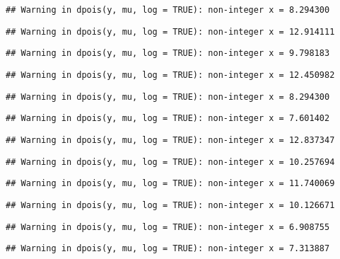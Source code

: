\documentclass[
]{article}
\begin{document}
\begin{verbatim}
## Warning in dpois(y, mu, log = TRUE): non-integer x = 8.294300
\end{verbatim}

\begin{verbatim}
## Warning in dpois(y, mu, log = TRUE): non-integer x = 12.914111
\end{verbatim}

\begin{verbatim}
## Warning in dpois(y, mu, log = TRUE): non-integer x = 9.798183
\end{verbatim}

\begin{verbatim}
## Warning in dpois(y, mu, log = TRUE): non-integer x = 12.450982
\end{verbatim}

\begin{verbatim}
## Warning in dpois(y, mu, log = TRUE): non-integer x = 8.294300
\end{verbatim}

\begin{verbatim}
## Warning in dpois(y, mu, log = TRUE): non-integer x = 7.601402
\end{verbatim}

\begin{verbatim}
## Warning in dpois(y, mu, log = TRUE): non-integer x = 12.837347
\end{verbatim}

\begin{verbatim}
## Warning in dpois(y, mu, log = TRUE): non-integer x = 10.257694
\end{verbatim}

\begin{verbatim}
## Warning in dpois(y, mu, log = TRUE): non-integer x = 11.740069
\end{verbatim}

\begin{verbatim}
## Warning in dpois(y, mu, log = TRUE): non-integer x = 10.126671
\end{verbatim}

\begin{verbatim}
## Warning in dpois(y, mu, log = TRUE): non-integer x = 6.908755
\end{verbatim}

\begin{verbatim}
## Warning in dpois(y, mu, log = TRUE): non-integer x = 7.313887
\end{verbatim}
\end{document}
